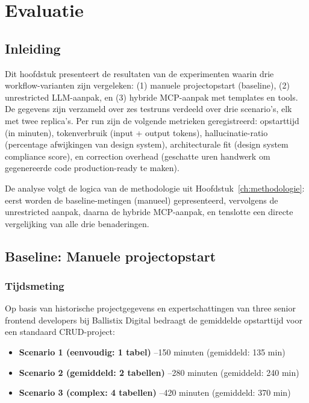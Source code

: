 
\chapter{Evaluatie}
\label{ch:evaluatie}

\section{Inleiding}

Dit hoofdstuk presenteert de resultaten van de experimenten waarin drie workflow-varianten zijn vergeleken: (1) manuele projectopstart (baseline), (2) unrestricted LLM-aanpak, en (3) hybride MCP-aanpak met templates en tools. De gegevens zijn verzameld over zes testruns verdeeld over drie scenario's, elk met twee replica's. Per run zijn de volgende metrieken geregistreerd: opstarttijd (in minuten), tokenverbruik (input + output tokens), hallucinatie-ratio (percentage afwijkingen van design system), architecturale fit (design system compliance score), en correction overhead (geschatte uren handwerk om gegenereerde code production-ready te maken).

De analyse volgt de logica van de methodologie uit Hoofdstuk~\ref{ch:methodologie}: eerst worden de baseline-metingen (manueel) gepresenteerd, vervolgens de unrestricted aanpak, daarna de hybride MCP-aanpak, en tenslotte een directe vergelijking van alle drie benaderingen.

\section{Baseline: Manuele projectopstart}

\subsection{Tijdsmeting}

Op basis van historische projectgegevens en expertschattingen van three senior frontend developers bij Ballistix Digital bedraagt de gemiddelde opstarttijd voor een standaard CRUD-project:

\begin{itemize}
  \item \textbf{Scenario 1 (eenvoudig: 1 tabel)} --150 minuten (gemiddeld: 135 min)
  \item \textbf{Scenario 2 (gemiddeld: 2 tabellen)} --280 minuten (gemiddeld: 240 min)
  \item \textbf{Scenario 3 (complex: 4 tabellen)} --420 minuten (gemiddeld: 370 min)
\end{itemize}


